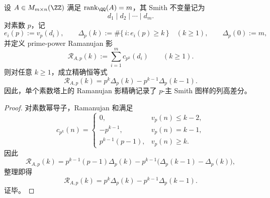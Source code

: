 \begin{theorem}\label{thm:conclusion-smith-pprimary-ramanujan-shadow-formula}
设 \(A\in M_{m\times n}(\ZZ)\) 满足 \(\operatorname{rank}_{\QQ}(A)=m\)，其 Smith 不变量记为
\[
d_1\mid d_2\mid\cdots\mid d_m.
\]
对素数 \(p\)，记
\[
e_i(p):=v_p(d_i),
\qquad
\Delta_p(k):=\#\{\,i:e_i(p)\ge k\,\}
\quad (k\ge 1),
\qquad
\Delta_p(0):=m,
\]
并定义 prime-power Ramanujan 影
\[
\mathcal R_{A,p}(k):=\sum_{i=1}^{m}c_{p^k}(d_i)
\qquad (k\ge 1).
\]
则对任意 \(k\ge 1\)，成立精确恒等式
\[
\mathcal R_{A,p}(k)=p^k\Delta_p(k)-p^{k-1}\Delta_p(k-1).
\]
因此，单个素数塔上的 Ramanujan 影精确记录了 \(p\)-主 Smith 图样的列高差分。
\end{theorem}
\begin{proof}
对素数幂导子，Ramanujan 和满足
\[
c_{p^k}(n)=
\begin{cases}
0, & v_p(n)\le k-2,\\[2pt]
-p^{k-1}, & v_p(n)=k-1,\\[2pt]
p^{k-1}(p-1), & v_p(n)\ge k.
\end{cases}
\]
因此
\[
\mathcal R_{A,p}(k)
=
p^{k-1}(p-1)\Delta_p(k)-p^{k-1}\bigl(\Delta_p(k-1)-\Delta_p(k)\bigr),
\]
整理即得
\[
\mathcal R_{A,p}(k)=p^k\Delta_p(k)-p^{k-1}\Delta_p(k-1).
\]
证毕。
\end{proof}

